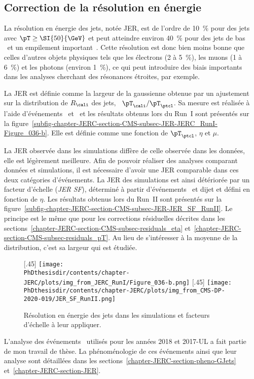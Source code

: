 \subsection{Correction de la résolution en énergie}\label{chapter-JERC-section-CMS-subsec-JER}
La résolution en énergie des jets, notée JER, est de l'ordre de \SI{10}{\%} pour des jets avec $\pT\geq\SI{50}{\GeV}$ et peut atteindre environ \SI{40}{\%} pour des jets de bas \pT\ et un empilement important~\cite{JERC_RunI}.
Cette résolution est donc bien moins bonne que celles d'autres objets physiques tels que les électrons (\num{2} à \SI{5}{\%}), les muons (\num{1} à \SI{6}{\%}) et les photons (environ \SI{1}{\%}), ce qui peut introduire des biais importants dans les analyses cherchant des résonances étroites, par exemple.
\par La JER est définie comme la largeur de la gaussienne obtenue par un ajustement sur la distribution de $R_\cali$ des jets, \ie\ $\pT_\cali/\pT_\ptcl$.
Sa mesure est réalisée à l'aide d'événements \Gjets\ et \Zjets\ et les résultats obtenus lors du Run~I sont présentés sur la figure~\ref{subfig-chapter-JERC-section-CMS-subsec-JER-JERC_RunI-Figure_036-b}.
Elle est définie comme une fonction de $\pT_\ptcl$, $\eta$ et $\mu$.
\par La JER observée dans les simulations diffère de celle observée dans les données, elle est légèrement meilleure.
Afin de pouvoir réaliser des analyses comparant données et simulations, il est nécessaire d'avoir une JER comparable dans ces deux catégories d'événements.
La JER des simulations est ainsi détériorée par un facteur d'échelle (\emph{JER SF}), déterminé à partir d'événements \Gjets\ et dijet et défini en fonction de $\eta$.
Les résultats obtenus lors du Run~II sont présentés sur la figure~\ref{subfig-chapter-JERC-section-CMS-subsec-JER-JER_SF_RunII}.
Le principe est le même que pour les corrections résiduelles décrites dans les sections~\ref{chapter-JERC-section-CMS-subsec-residuals_eta} et~\ref{chapter-JERC-section-CMS-subsec-residuals_pT}. Au lieu de s'intéresser à la moyenne de la distribution, c'est sa largeur qui est étudiée.
\begin{figure}[h]
\centering
{}[.45\textwidth]
{\texttt{[image: \\PhDthesisdir/contents/chapter-JERC/plots/img\_from\_JERC\_RunI/Figure\_036-b.png]}}
\hfill
{}[.45\textwidth]
{\texttt{[image: \\PhDthesisdir/contents/chapter-JERC/plots/img\_from\_CMS-DP-2020-019/JER\_SF\_RunII.png]}}
\caption[Résolution en énergie des jets.]{Résolution en énergie des jets dans les simulations et facteurs d'échelle à leur appliquer.}
\label{fig-chapter-JERC-section-CMS-subsec-JER}
\end{figure}
\par L'analyse des événements \Gjets\ utilisés pour les années 2018 et 2017-UL a fait partie de mon travail de thèse.
La phénoménologie de ces événements ainsi que leur analyse sont détaillées dans les sections~\ref{chapter-JERC-section-pheno-GJets} et~\ref{chapter-JERC-section-JER}.
